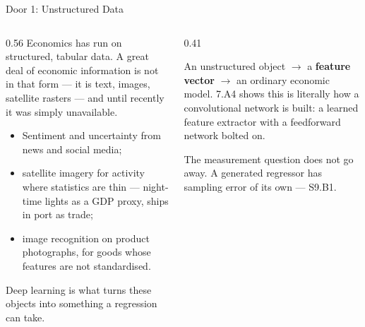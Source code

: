 \begin{frame}{Door 1: Unstructured Data}
\begin{columns}[T]
\begin{column}{0.56\textwidth}
\small
Economics has run on structured, tabular data. A great deal of economic information is not in that form --- it is text, images, satellite rasters --- and until recently it was simply unavailable.
\medskip

\begin{itemize}\small\setlength{\itemsep}{1.2mm}
  \item Sentiment and uncertainty from news and social media;
  \item satellite imagery for activity where statistics are thin --- night-time lights as a GDP proxy, ships in port as trade;
  \item image recognition on product photographs, for goods whose features are not standardised.
\end{itemize}
\medskip

Deep learning is what turns these objects into something a regression can take.
\end{column}
\begin{column}{0.41\textwidth}
\begin{conceptbox}[title=\textbf{The move, in one line}]\small
An unstructured object $\to$ a \textbf{feature vector} $\to$ an ordinary economic model.
\medskip
7.A4 shows this is literally how a convolutional network is built: a learned feature extractor with a feedforward network bolted on.
\end{conceptbox}
\medskip
\begin{examplebox}\footnotesize
The measurement question does not go away. A generated regressor has sampling error of its own --- S9.B1.
\end{examplebox}
\end{column}
\end{columns}
\end{frame}

